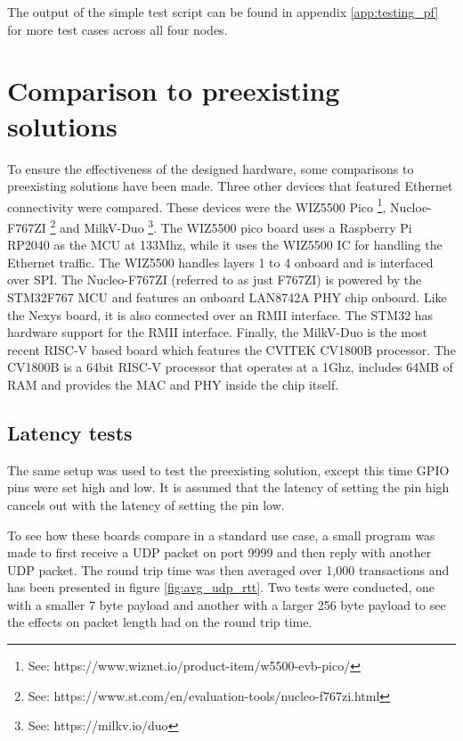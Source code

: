 The output of the simple test script can be found in appendix \ref{app:testing_pf} for more test cases across all four nodes.





\section{Comparison to preexisting solutions}

To ensure the effectiveness of the designed hardware, some comparisons to preexisting solutions have been made. Three other devices that featured Ethernet connectivity were compared. These devices were the WIZ5500 Pico \footnote[1]{See: https://www.wiznet.io/product-item/w5500-evb-pico/}, Nucloe-F767ZI \footnote[2]{See: https://www.st.com/en/evaluation-tools/nucleo-f767zi.html} and MilkV-Duo \footnote[3]{See: https://milkv.io/duo}. The WIZ5500 pico board uses a Raspberry Pi RP2040 as the MCU at 133Mhz, while it uses the WIZ5500 IC for handling the Ethernet traffic. The WIZ5500 handles layers 1 to 4 onboard and is interfaced over SPI. The Nucleo-F767ZI (referred to as just F767ZI) is powered by the STM32F767 MCU and features an onboard LAN8742A PHY chip onboard. Like the Nexys board, it is also connected over an RMII interface. The STM32 has hardware support for the RMII interface. Finally, the MilkV-Duo is the most recent RISC-V based board which features the CVITEK CV1800B processor. The CV1800B is a 64bit RISC-V processor that operates at a 1Ghz, includes 64MB of RAM and provides the MAC and PHY inside the chip itself.

\subsection{Latency tests}


The same setup was used to test the preexisting solution, except this time GPIO pins were set high and low. It is assumed that the latency of setting the pin high cancels out with the latency of setting the pin low. 




To see how these boards compare in a standard use case, a small program was made to first receive a UDP packet on port 9999 and then reply with another UDP packet. The round trip time was then averaged over 1,000 transactions and has been presented in figure \ref{fig:avg_udp_rtt}. Two tests were conducted, one with a smaller 7 byte payload and another with a larger 256 byte payload to see the effects on packet length had on the round trip time. 

